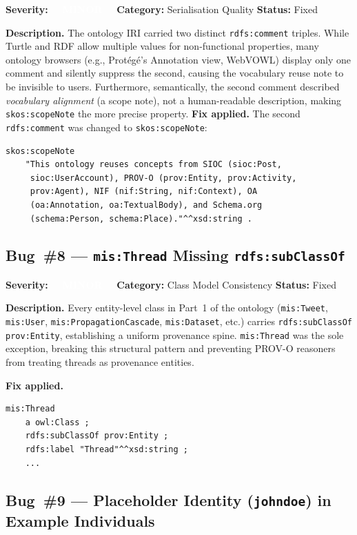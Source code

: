 \documentclass[11pt, a4paper]{article}
\newcommand{\badgeMinor}{\textcolor{white}{\colorbox{severity-minor}{\footnotesize\textbf{\ \ MINOR\ \ }}}}
\begin{document}
\textbf{Severity:} \badgeMinor\quad
\textbf{Category:} Serialisation Quality\quad
\textbf{Status:} Fixed

\textbf{Description.}
The ontology IRI carried two distinct \texttt{rdfs:comment} triples.
While Turtle and RDF allow multiple values for non-functional properties,
many ontology browsers (e.g., Protégé's Annotation view, WebVOWL) display
only one comment and silently suppress the second, causing the vocabulary
reuse note to be invisible to users.
Furthermore, semantically, the second comment described \emph{vocabulary
alignment} (a scope note), not a human-readable description, making
\texttt{skos:scopeNote} the more precise property.
\newpage
\textbf{Fix applied.}
The second \texttt{rdfs:comment} was changed to \texttt{skos:scopeNote}:
\begin{lstlisting}
skos:scopeNote
    "This ontology reuses concepts from SIOC (sioc:Post,
     sioc:UserAccount), PROV-O (prov:Entity, prov:Activity,
     prov:Agent), NIF (nif:String, nif:Context), OA
     (oa:Annotation, oa:TextualBody), and Schema.org
     (schema:Person, schema:Place)."^^xsd:string .
\end{lstlisting}

\subsection{Bug~\#8 --- \texttt{mis:Thread} Missing \texttt{rdfs:subClassOf}}
\label{bug:8}

\textbf{Severity:} \badgeMinor\quad
\textbf{Category:} Class Model Consistency\quad
\textbf{Status:} Fixed

\textbf{Description.}
Every entity-level class in Part~1 of the ontology
(\texttt{mis:Tweet}, \texttt{mis:User}, \texttt{mis:PropagationCascade},
\texttt{mis:Dataset}, etc.) carries \texttt{rdfs:subClassOf prov:Entity},
establishing a uniform provenance spine. \texttt{mis:Thread} was the sole
exception, breaking this structural pattern and preventing PROV-O reasoners
from treating threads as provenance entities.

\textbf{Fix applied.}
\begin{lstlisting}
mis:Thread
    a owl:Class ;
    rdfs:subClassOf prov:Entity ;
    rdfs:label "Thread"^^xsd:string ;
    ...
\end{lstlisting}

\subsection{Bug~\#9 --- Placeholder Identity (\texttt{johndoe}) in Example Individuals}
\label{bug:9}
\end{document}
